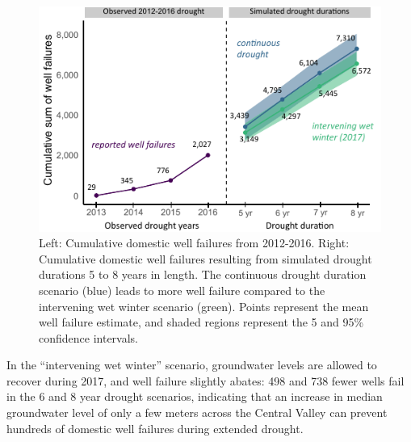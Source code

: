 \begin{figure}%
	\includegraphics[width=\linewidth]{ch2_figs/fig_cum_sum_fail.pdf}
	\caption{Left: Cumulative domestic well failures from 2012-2016. Right: Cumulative domestic well failures resulting from simulated drought durations 5 to 8 years in length. The continuous drought duration scenario (blue) leads to more well failure compared to the intervening wet winter scenario (green). Points represent the mean well failure estimate, and shaded regions represent the 5 and 95\% confidence intervals. %
	}
	\label{fig:cum_sum_failure}
\end{figure}


In the ``intervening wet winter'' scenario, groundwater levels are allowed to recover during 2017, and well failure slightly abates: 498 and 738 fewer wells fail in the 6 and 8 year drought scenarios, indicating that an increase in median groundwater level of only a few meters across the Central Valley can prevent hundreds of domestic well failures during extended drought.  


